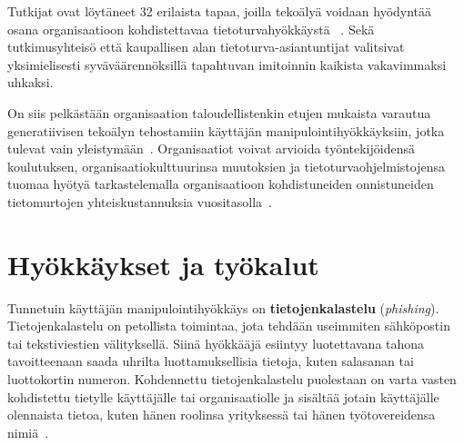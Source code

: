 \begin{otherlanguage}{finnish}
Tutkijat ovat löytäneet 32 erilaista tapaa, joilla tekoälyä voidaan hyödyntää osana organisaatioon kohdistettavaa tietoturvahyökkäystä ~\citep{mirsky_Threat_Offensive_AI_Organizations_2023}. Sekä tutkimusyhteisö että kaupallisen alan tietoturva-asiantuntijat valitsivat yksimielisesti syväväärennöksillä tapahtuvan imitoinnin kaikista vakavimmaksi uhkaksi.
\newpage

On siis pelkästään organisaation taloudellistenkin etujen mukaista varautua generatiivisen tekoälyn tehostamiin käyttäjän manipulointihyökkäyksiin, jotka tulevat vain yleistymään~\citep{blauth_AI_Crime_Overview_Malicious_Use_Abuse_2022}. Organisaatiot voivat arvioida työntekijöidensä koulutuksen, organisaatiokulttuurinsa muutoksien ja tietoturvaohjelmistojensa tuomaa hyötyä tarkastelemalla organisaatioon kohdistuneiden onnistuneiden tietomurtojen yhteiskustannuksia vuositasolla~\citep{ibm_Cost_Data_Breach_Report_2024}.







\section*{Hyökkäykset ja työkalut}

Tunnetuin käyttäjän manipulointihyökkäys on \textbf{tietojenkalastelu} (\textit{phishing}). Tietojenkalastelu on petollista toimintaa, jota tehdään useimmiten sähköpostin tai tekstiviestien välityksellä. Siinä hyökkääjä esiintyy luotettavana tahona tavoitteenaan saada uhrilta luottamuksellisia tietoja, kuten salasanan tai luottokortin numeron. Kohdennettu tietojenkalastelu puolestaan on varta vasten kohdistettu tietylle käyttäjälle tai organisaatiolle ja sisältää jotain käyttäjälle olennaista tietoa, kuten hänen roolinsa yrityksessä tai hänen työtovereidensa nimiä~\citep{wang_Defining_Social_Engineering_2020}.


\end{otherlanguage}
